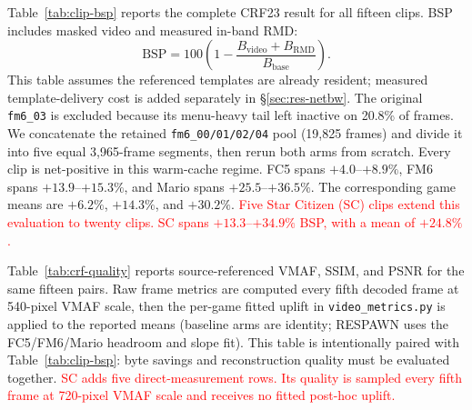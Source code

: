 Table~\ref{tab:clip-bsp} reports the complete CRF23 result for all fifteen
clips. BSP includes masked video and measured in-band RMD:
\[
  \mathrm{BSP}=100\left(1-\frac{B_{\mathrm{video}}+B_{\mathrm{RMD}}}
  {B_{\mathrm{base}}}\right).
\]
This table assumes the referenced templates are already resident; measured
template-delivery cost is added separately in \S\ref{sec:res-netbw}. The
original \texttt{fm6\_03} is excluded because its menu-heavy tail left
\sysname inactive on 20.8\% of frames. We concatenate the retained
\texttt{fm6\_00/01/02/04} pool (19,825 frames) and divide it into five
equal 3,965-frame segments, then rerun both arms from scratch. Every
clip is net-positive in this warm-cache regime. FC5 spans $+4.0$--$+8.9\%$,
FM6 spans $+13.9$--$+15.3\%$, and Mario spans $+25.5$--$+36.5\%$.
The corresponding game means are $+6.2\%$, $+14.3\%$, and $+30.2\%$.
\textcolor{red}{Five Star Citizen (SC) clips extend this evaluation to twenty clips.
SC spans $+13.3$--$+34.9\%$ BSP, with a mean of $+24.8\%$.}

\begin{table}[t]
  \centering
  \footnotesize
  \caption{Net BSP for every CRF23 clip. ``Video'' is the masked H.264 stream;
  RMD is measured in-band metadata. Template delivery is excluded here and
  charged explicitly in Table~\ref{tab:measured-cache}. Positive is better.}
  \label{tab:clip-bsp}
  \setlength{\tabcolsep}{3pt}
  
\end{table}

Table~\ref{tab:crf-quality} reports source-referenced VMAF, SSIM, and PSNR for
the same fifteen pairs. Raw frame metrics are computed every fifth decoded
frame at 540-pixel VMAF scale, then the per-game fitted uplift in
\texttt{video\_metrics.py} is applied to the reported means (baseline arms are
identity; RESPAWN uses the FC5/FM6/Mario headroom and slope fit). This table
is intentionally paired with Table~\ref{tab:clip-bsp}: byte savings and
reconstruction quality must be evaluated together.
\textcolor{red}{SC adds five direct-measurement rows. Its quality is sampled every fifth
frame at 720-pixel VMAF scale and receives no fitted post-hoc uplift.}

\begin{table}[t]
  \centering
  \footnotesize
  \caption{Per-clip source-referenced quality at CRF23 after the fitted
  uplift. Base is the matched pure stream and RESP is the reconstructed
  \sysname stream.}
  \label{tab:crf-quality}
  
\end{table}

